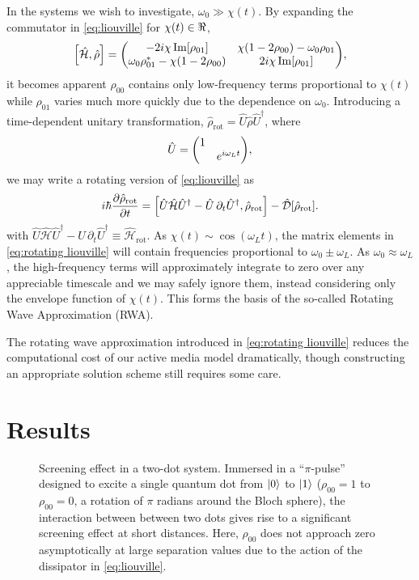 \documentclass[conference]{IEEEtran}
\begin{document}
In the systems we wish to investigate, $\omega_0 \gg \chi(t)$. By expanding the commutator in \cref{eq:liouville} for $\chi(t) \in \real$,
\begin{equation}
  \commutator{\hat{\mathcal{H}}}{\hat{\rho}} =
  \mqty(
    -2 i \chi \Im[\rho_{01}] & \chi\qty(1 - 2 \rho_{00}) - \omega_0 \rho_{01} \\
    \omega_0 \rho_{01}^* - \chi\qty(1 - 2\rho_{00}) & 2 i \chi \Im[\rho_{01}]
  ),
\end{equation}
it becomes apparent $\rho_{00}$ contains only low-frequency terms proportional to $\chi(t)$ while $\rho_{01}$ varies much more quickly due to the dependence on $\omega_0$.
Introducing a time-dependent unitary transformation, $\hat{\rho}_\text{rot} = \hat{U}\hat{\rho}\hat{U}^\dagger$, where
\begin{equation}
  \hat{U} = \mqty(\dmat{1, e^{i \omega_L t}}),
  \label{eq:unitary transformation}
\end{equation}
we may write a rotating version of \cref{eq:liouville} as
\begin{equation}
  i \hbar \pdv{\hat{\rho}_\text{rot}}{t} = \commutator{\hat{U} \hat{\mathcal{H}} \hat{U}^\dagger - \hat{U} \, \partial_t \hat{U}^\dagger}{\hat{\rho}_\text{rot}} - \hat{\mathcal{D}}[\hat{\rho}_\text{rot}].
  \label{eq:rotating liouville}
\end{equation}
with $\hat{U} \hat{\mathcal{H}} \hat{U}^\dagger - \hat{U} \, \partial_t \hat{U}^\dagger \equiv \hat{\mathcal{H}}_\text{rot}$.  
As $\chi(t) \sim \cos(\omega_L t)$, the matrix elements in \cref{eq:rotating liouville} will contain frequencies proportional to $\omega_0 \pm \omega_L$.
As $\omega_0 \approx \omega_L$, the high-frequency terms will approximately integrate to zero over any appreciable timescale and we may safely ignore them, instead considering only the envelope function of $\chi(t)$. This forms the basis of the so-called Rotating Wave Approximation (RWA)\cite{Allen1987}.


The rotating wave approximation introduced in \cref{eq:rotating liouville} reduces the computational cost of our active media model dramatically, though constructing an appropriate solution scheme still requires some care.


\section{Results}

\begin{figure}
  \centering
  
  \caption{\label{fig:screening} Screening effect in a two-dot system.
  Immersed in a ``$\pi$-pulse'' designed to excite a single quantum dot from $\ket{0}$ to $\ket{1}$ ($\rho_{00} = 1$ to $\rho_{00} = 0$, a rotation of $\pi$ radians around the Bloch sphere), the interaction between between two dots gives rise to a significant screening effect at short distances.
  Here, $\rho_{00}$ does not approach zero asymptotically at large separation values due to the action of the dissipator in \cref{eq:liouville}.
  }
\end{figure}
\end{document}
